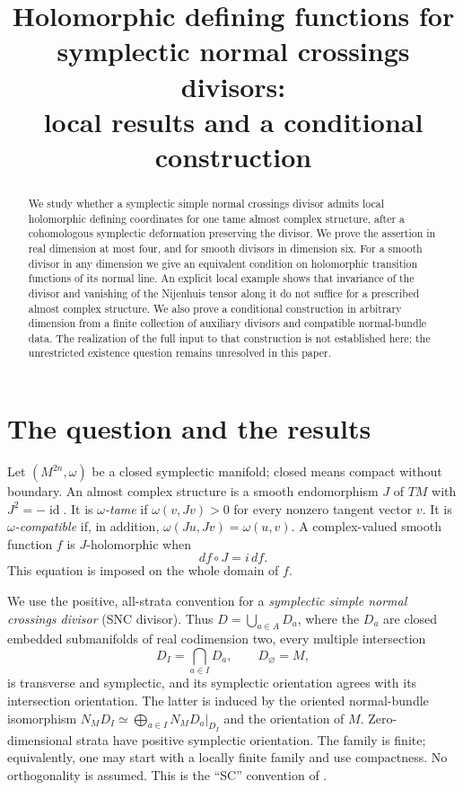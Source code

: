 \documentclass[11pt]{article}
\title{Holomorphic defining functions for symplectic normal crossings divisors:\\local results and a conditional construction}
\author{}
\date{}
\theoremstyle{definition}
\theoremstyle{remark}
\newcommand{\id}{\operatorname{id}}
\begin{document}
\maketitle
\begin{abstract}
We study whether a symplectic simple normal crossings divisor admits local holomorphic defining coordinates for one tame almost complex structure, after a cohomologous symplectic deformation preserving the divisor. We prove the assertion in real dimension at most four, and for smooth divisors in dimension six. For a smooth divisor in any dimension we give an equivalent condition on holomorphic transition functions of its normal line. An explicit local example shows that invariance of the divisor and vanishing of the Nijenhuis tensor along it do not suffice for a prescribed almost complex structure. We also prove a conditional construction in arbitrary dimension from a finite collection of auxiliary divisors and compatible normal-bundle data. The realization of the full input to that construction is not established here; the unrestricted existence question remains unresolved in this paper.
\end{abstract}

\section{The question and the results}

Let $(M^{2n},\omega)$ be a closed symplectic manifold; closed means compact without boundary. An almost complex structure is a smooth endomorphism $J$ of $TM$ with $J^2=-\id$. It is \emph{$\omega$-tame} if $\omega(v,Jv)>0$ for every nonzero tangent vector $v$. It is \emph{$\omega$-compatible} if, in addition, $\omega(Ju,Jv)=\omega(u,v)$. A complex-valued smooth function $f$ is $J$-holomorphic when
\begin{equation}\label{eq:holomorphic}
 df\circ J=i\,df.
\end{equation}
This equation is imposed on the whole domain of $f$.

We use the positive, all-strata convention for a \emph{symplectic simple normal crossings divisor} (SNC divisor). Thus $D=\bigcup_{a\in A}D_a$, where the $D_a$ are closed embedded submanifolds of real codimension two, every multiple intersection
\[
 D_I=\bigcap_{a\in I}D_a,\qquad D_\varnothing=M,
\]
is transverse and symplectic, and its symplectic orientation agrees with its intersection orientation. The latter is induced by the oriented normal-bundle isomorphism
$N_MD_I\simeq\bigoplus_{a\in I}N_MD_a|_{D_I}$ and the orientation of $M$.
Zero-dimensional strata have positive symplectic orientation. The family is finite; equivalently, one may start with a locally finite family and use compactness. No orthogonality is assumed. This is the ``SC'' convention of \cite[Definition 2.1]{TMZ}.
\end{document}
